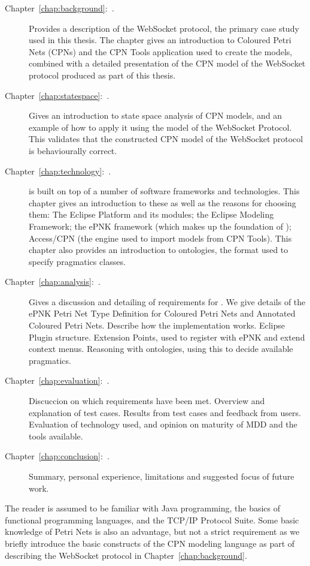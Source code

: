 \begin{description}
\item[Chapter~\ref{chap:background}:~.] Provides a
description of the WebSocket protocol, the primary case study used in this
thesis. The chapter gives an introduction to Coloured Petri Nets (CPNs) and the
CPN Tools application used to create the models, combined with a detailed
presentation of the CPN model of the WebSocket protocol produced as part of this
thesis.
\item[Chapter~\ref{chap:statespace}:~.] Gives an
introduction to state space analysis of CPN models, and an example of how to
apply it using the model of the WebSocket Protocol. This validates that the
constructed CPN model of the WebSocket protocol is behaviourally correct.
\item [Chapter~\ref{chap:technology}:~.] \thename{} is built
on top of a number of software frameworks and technologies.
This chapter gives an introduction to these as well as the reasons for choosing
them: The Eclipse Platform and its modules; the Eclipse Modeling Framework; the ePNK
framework (which makes up the foundation of \thename{}); Access/CPN (the engine
used to import models from CPN Tools). This chapter also provides an
introduction to ontologies, the format used to specify pragmatics classes.
\item [Chapter~\ref{chap:analysis}:~.] Gives a
discussion and detailing of requirements for \thename{}. 
We give details of the ePNK Petri Net Type Definition for Coloured Petri Nets and
Annotated Coloured Petri Nets. Describe how the implementation works.
Eclipse Plugin structure. Extension Points, used to register with ePNK
and extend context menus. Reasoning with ontologies, using this to decide
available pragmatics. 
\item [Chapter~\ref{chap:evaluation}:~.] Discuccion on
which requirements have been met. Overview and explanation of test cases.
Results from test cases and feedback from users. Evaluation of technology used,
and opinion on maturity of MDD and the tools available.
\item [Chapter~\ref{chap:conclusion}:~.] Summary,
personal experience, limitations and suggested focus of future work.
\end{description} 


The reader is assumed to be familiar with Java programming, the basics of
functional programming languages, and the TCP/IP Protocol Suite. Some basic
knowledge of Petri Nets is also an advantage, but not a strict requirement as we
briefly introduce the basic constructs of the CPN modeling language as part of
describing the WebSocket protocol in Chapter~\ref{chap:background}.
